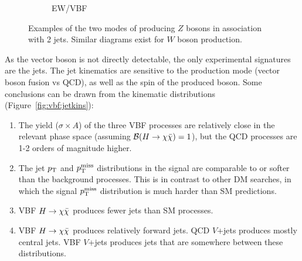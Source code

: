 \begin{figure}[]
\begin{center}
\begin{subfigure}[t]{0.49\textwidth}
            \caption{EW/VBF}
        \end{subfigure}
        \caption{Examples of the two modes of producing $Z$ bosons in association with 2 jets.
                 Similar diagrams exist for $W$ boson production.}
        \label{fig:vbf:ewqcd}
    \end{center}
\end{figure}

As the vector boson is not directly detectable, the only experimental signatures are the jets.
The jet kinematics are sensitive to the production mode (vector boson fusion vs QCD), as well as the spin of the produced boson.
Some conclusions can be drawn from the kinematic distributions (Figure~\ref{fig:vbf:jetkins}):
\begin{enumerate}
    \item The yield ($\sigma\times A$) of the three VBF processes are relatively close in the relevant phase space (assuming $\mathcal{B}(H\rightarrow\chi\bar\chi)=1$), but the QCD processes are 1-2 orders of magnitude higher.
    \item The jet $p_\mathrm{T}$ and $p_\mathrm{T}^\mathrm{miss}$ distributions in the signal are comparable to or softer than the background processes. 
          This is in contrast to other DM searches, in which the signal $p_\mathrm{T}^\mathrm{miss}$ distribution is much harder than SM predictions.
    \item VBF $H\rightarrow\chi\bar\chi$ produces fewer jets than SM processes.
    \item VBF $H\rightarrow\chi\bar\chi$ produces relatively forward jets. QCD $V$+jets produces mostly central jets. VBF $V$+jets produces jets that are somewhere between these distributions. 
\end{enumerate}

